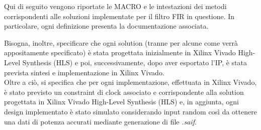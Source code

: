 Qui di seguito vengono riportate le MACRO e le intestazioni dei metodi corrispondenti alle soluzioni implementate per il filtro FIR in questione. In particolare, ogni definizione presenta la documentazione associata.

Bisogna, inoltre, specificare che ogni solution (tranne per alcune come verrà appositamente specificato) è stata progettata inizialmente in Xilinx\textsuperscript{\textregistered} Vivado\textsuperscript{\textregistered} High-Level Synthesis (HLS) e poi, successivamente, dopo aver esportato l'IP, è stata prevista sintesi e implementazione in Xilinx\textsuperscript{\textregistered} Vivado\textsuperscript{\textregistered}. 
\\
Oltre a ciò, si specifica che per ogni implementazione, effettuata in Xilinx\textsuperscript{\textregistered} Vivado\textsuperscript{\textregistered}, è stato previsto un constraint di clock associato e corrispondente alla solution progettata in Xilinx\textsuperscript{\textregistered} Vivado\textsuperscript{\textregistered} High-Level Synthesis (HLS) e, in aggiunta, ogni design implementato è stato simulato considerando input random così da ottenere una dati di potenza accurati mediante generazione di file \textit{.saif}.